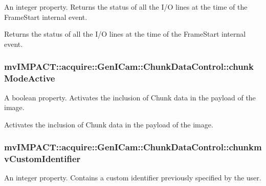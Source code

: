 An integer property. Returns the status of all the I/\+O lines at the time of the Frame\+Start internal event. 

Returns the status of all the I/\+O lines at the time of the Frame\+Start internal event. \hypertarget{classmv_i_m_p_a_c_t_1_1acquire_1_1_gen_i_cam_1_1_chunk_data_control_aae91a9b1196e832dccef5e078a75c2ee}{
\subsubsection[{chunk\+Mode\+Active}]{ mv\+I\+M\+P\+A\+C\+T\+::acquire\+::\+Gen\+I\+Cam\+::\+Chunk\+Data\+Control\+::chunk\+Mode\+Active}}\label{classmv_i_m_p_a_c_t_1_1acquire_1_1_gen_i_cam_1_1_chunk_data_control_aae91a9b1196e832dccef5e078a75c2ee}


A boolean property. Activates the inclusion of Chunk data in the payload of the image. 

Activates the inclusion of Chunk data in the payload of the image. \hypertarget{classmv_i_m_p_a_c_t_1_1acquire_1_1_gen_i_cam_1_1_chunk_data_control_a504add88bb062ed69bf85424113cb2a7}{
\subsubsection[{chunkmv\+Custom\+Identifier}]{ mv\+I\+M\+P\+A\+C\+T\+::acquire\+::\+Gen\+I\+Cam\+::\+Chunk\+Data\+Control\+::chunkmv\+Custom\+Identifier}}\label{classmv_i_m_p_a_c_t_1_1acquire_1_1_gen_i_cam_1_1_chunk_data_control_a504add88bb062ed69bf85424113cb2a7}


An integer property. Contains a custom identifier previously specified by the user. 

